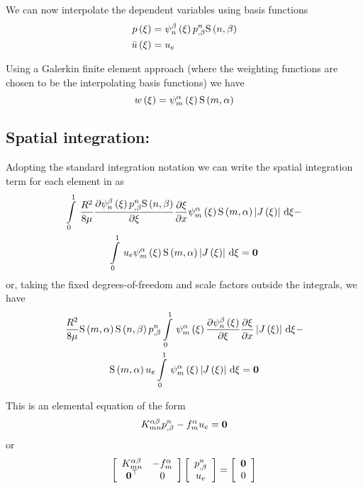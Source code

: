 We can now interpolate the dependent variables using basis functions
\begin{equation}
  \begin{split}
     p\left( \xi \right)  &=    \psi_{n}^{\beta} \left( \xi \right)    {p}^{n} _{,\beta}    \mathrm{S} \left( n,\beta \right)   \\
     \bar{u}\left( \xi \right)  &=  u_{e} 
  \end{split}
\end{equation}

Using a Galerkin finite element approach (where the weighting functions are
chosen to be the interpolating basis functions) we have 
\begin{equation}
   w\left( \xi \right) =   \psi_{m}^{\alpha} \left( \xi \right)     \mathrm{S} \left( m,\alpha \right)  
\end{equation}

\subsection{Spatial integration:}

Adopting the standard integration notation we can write the spatial
integration term for each element in  as
\begin{multline}
  \gint{0}{1}{\frac{R^{2}}{8\mu}\delby{\gbfn{n}{\beta}{\xi}\nodedof{p}{n}{\beta}\gsf{n}{\beta}}{\xi}
    \delby{\xi}{x}\gbfn{m}{\alpha}{\xi}\gsf{m}{\alpha}\abs{\fnof{J}{\xi}}}{\xi}- \\
  \gint{0}{1}{\elementdof{u}{e}\gbfn{m}{\alpha}{\xi}\gsf{m}{\alpha}\abs{\fnof{J}{\xi}}}{\xi}=\vectr{0}
  \label{eqn:Poiseullefemform1}
\end{multline}
or, taking the fixed degrees-of-freedom and scale factors outside the integrals, we have
\begin{multline}
  \frac{R^{2}}{8\mu}\gsf{m}{\alpha}\gsf{n}{\beta}\nodedof{p}{n}{\beta}\gint{0}{1}{\gbfn{m}{\alpha}{\xi}
    \delby{\gbfn{n}{\beta}{\xi}}{\xi}\delby{\xi}{x}\abs{\fnof{J}{\xi}}}{\xi}- \\
  \gsf{m}{\alpha}\elementdof{u}{e}\gint{0}{1}{\gbfn{m}{\alpha}{\xi}\abs{\fnof{J}{\xi}}}{\xi}=\vectr{0}
  \label{eqn:Poiseullefemform2}
\end{multline}

This is an elemental equation of the form
\begin{equation}
  K^{\alpha\beta}_{mn}  {p}^{n} _{,\beta} -f^{\alpha}_{m} u_{e} = \boldsymbol{0} 
\end{equation}
or
\begin{equation}
  \left[ \begin{array}{cc}
      K^{\alpha\beta}_{mn} & -f^{\alpha}_{m} \\
       { \boldsymbol{0} }^{ \top }  & 0
    \end{array} \right] \left[ \begin{array}{c}
        {p}^{n} _{,\beta}  \\
       u_{e} 
    \end{array} \right] =  \left[ \begin{array}{c}
       \boldsymbol{0}  \\
      0
    \end{array} \right]
\end{equation}

